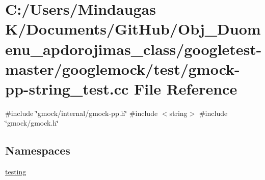 \hypertarget{googletest-master_2googlemock_2test_2gmock-pp-string__test_8cc}{}\section{C\+:/\+Users/\+Mindaugas K/\+Documents/\+Git\+Hub/\+Obj\+\_\+\+Duomenu\+\_\+apdorojimas\+\_\+class/googletest-\/master/googlemock/test/gmock-\/pp-\/string\+\_\+test.cc File Reference}
\label{googletest-master_2googlemock_2test_2gmock-pp-string__test_8cc}
{\ttfamily \#include \char`\"{}gmock/internal/gmock-\/pp.\+h\char`\"{}}\newline
{\ttfamily \#include $<$string$>$}\newline
{\ttfamily \#include \char`\"{}gmock/gmock.\+h\char`\"{}}\newline
\subsection*{Namespaces}
\begin{DoxyCompactItemize}
\item 
 \mbox{\hyperlink{namespacetesting}{testing}}
\end{DoxyCompactItemize}
